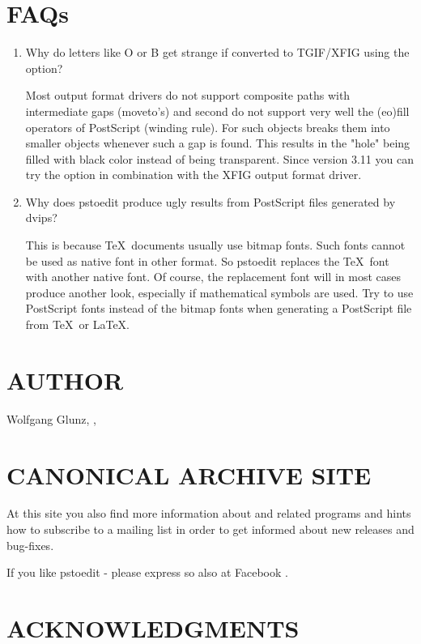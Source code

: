 \documentclass[english,a4paper]{article}
\begin{document}
\section{FAQs}

\begin{enumerate}
\item Why do letters like O or B get strange if converted to TGIF/XFIG
using the  option?

Most output format drivers do not support composite paths with
intermediate gaps (moveto's) and second do not support very well the (eo)fill
operators of PostScript (winding rule). For such objects  breaks
them into smaller objects whenever such a gap is found. This results in the
"hole" being filled with black color instead of being transparent. Since
version 3.11 you can try the  option in combination with the XFIG
output format driver.

\item Why does pstoedit produce ugly results from PostScript files generated by dvips?

This is because \TeX\ documents usually use bitmap fonts. Such fonts cannot be used as native
font in other format. So pstoedit replaces the \TeX\ font with another native
font. Of course, the replacement font will in most cases produce another
look, especially if mathematical symbols are used.
Try to use PostScript fonts instead of the bitmap fonts when generating a PostScript file from \TeX\ or \LaTeX.
\end{enumerate}

\section{AUTHOR}
Wolfgang Glunz, , 

\section{CANONICAL ARCHIVE SITE}

At this site you also find more information about  and related
programs and hints how to subscribe to a mailing list in order to get informed
about new releases and bug-fixes.

If you like pstoedit - please express so also at Facebook .

\section{ACKNOWLEDGMENTS}
\end{document}
